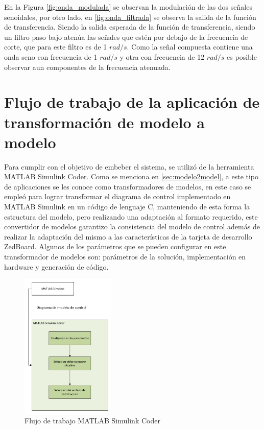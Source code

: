 En la Figura \ref{fig:onda_modulada} se observan la modulación de las dos señales senoidales, por otro lado, en \ref{fig:onda_filtrada} se observa la salida de la función de transferencia. Siendo la salida esperada de la función de transferencia, siendo un filtro paso bajo atenúa las señales que estén por debajo de la frecuencia de corte, que para este filtro es de 1 $rad/s$. Como la señal compuesta contiene una onda seno con frecuencia de 1 $rad/s$ y otra con frecuencia de 12 $rad/s$ es posible observar aun componentes de la frecuencia atenuada.

\section{Flujo de trabajo de la aplicación de transformación de modelo a modelo}\label{sec:m2m_transformator}

Para  cumplir con el objetivo de embeber el sistema, se utilizó de la herramienta MATLAB Simulink Coder. Como se menciona en \ref{sec:modelo2model}, a este tipo de aplicaciones se les conoce como transformadores de modelos, en este caso se empleó para lograr transformar el diagrama de control implementado en MATLAB Simulink en un código de lenguaje C, manteniendo de esta forma la estructura del modelo, pero realizando una adaptación al formato requerido, este convertidor de modelos garantizo la consistencia del modelo de control además de realizar la adaptación del mismo a las características de la tarjeta de desarrollo ZedBoard. Algunos de los parámetros que se pueden configurar en este transformador de modelos son: parámetros de la solución, implementación en hardware y generación de código.
\newpage

\begin{figure}[h!]
    \centering
    \includegraphics[width=0.4\textwidth]{fig/especifico_2/M2MT/model_2_model_diagram.pdf}
    \caption{Flujo de trabajo MATLAB Simulink Coder}
    \label{fig:m2m_matlab_simulink_coder}
\end{figure}

